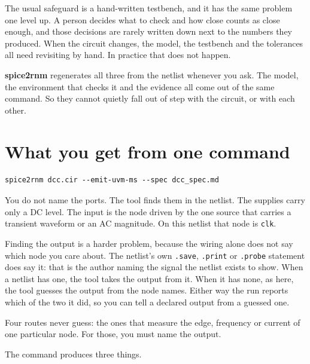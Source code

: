 \documentclass[11pt,a4paper]{article}
\begin{document}
The usual safeguard is a hand-written testbench, and it has the same
problem one level up. A person decides what to check and how close
counts as close enough, and those decisions are rarely written down
next to the numbers they produced. When the circuit changes, the
model, the testbench and the tolerances all need revisiting by hand.
In practice that does not happen.

\textbf{spice2rnm} regenerates all three from the netlist whenever you
ask. The model, the environment that checks it and the evidence all
come out of the same command. So they cannot quietly fall out of step
with the circuit, or with each other.

\section{What you get from one command}

\begin{lstlisting}
spice2rnm dcc.cir --emit-uvm-ms --spec dcc_spec.md
\end{lstlisting}

\noindent You do not name the ports. The tool finds them in the
netlist. The supplies carry only a DC level. The input is the node
driven by the one source that carries a transient waveform or an AC
magnitude. On this netlist that node is \texttt{clk}.

Finding the output is a harder problem, because the wiring alone does
not say which node you care about. The netlist's own \texttt{.save},
\texttt{.print} or \texttt{.probe} statement does say it: that is the
author naming the signal the netlist exists to show. When a netlist
has one, the tool takes the output from it. When it has none, as here,
the tool guesses the output from the node names. Either way the run
reports which of the two it did, so you can tell a declared output
from a guessed one.

Four routes never guess: the ones that measure the edge, frequency or
current of one particular node. For those, you must name the output.

The command produces three things.
\end{document}
